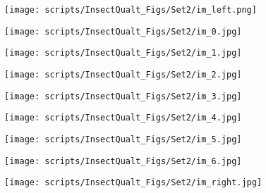 \documentclass[10pt,twocolumn,letterpaper]{article}
\begin{document}
\begin{table*}[!t]
\begin{figure*}[t]
\begin{center}
    \begin{subfigure}[b]{0.1\textwidth}
        \centering
        \texttt{[image: scripts/InsectQualt\_Figs/Set2/im\_left.png]}
    \end{subfigure}
    \hfill
    \begin{subfigure}[b]{0.1\textwidth}
        \centering
        \texttt{[image: scripts/InsectQualt\_Figs/Set2/im\_0.jpg]}
    \end{subfigure}
    \hfill
    \begin{subfigure}[b]{0.1\textwidth}
        \centering
        \texttt{[image: scripts/InsectQualt\_Figs/Set2/im\_1.jpg]}
    \end{subfigure}
    \hfill
    \begin{subfigure}[b]{0.1\textwidth}
        \centering
        \texttt{[image: scripts/InsectQualt\_Figs/Set2/im\_2.jpg]}
    \end{subfigure}
    \hfill
    \begin{subfigure}[b]{0.1\textwidth}
        \centering
        \texttt{[image: scripts/InsectQualt\_Figs/Set2/im\_3.jpg]}
    \end{subfigure}
    \hfill
    \begin{subfigure}[b]{0.1\textwidth}
        \centering
        \texttt{[image: scripts/InsectQualt\_Figs/Set2/im\_4.jpg]}
    \end{subfigure}
    \hfill
    \begin{subfigure}[b]{0.1\textwidth}
        \centering
        \texttt{[image: scripts/InsectQualt\_Figs/Set2/im\_5.jpg]}
    \end{subfigure}
    \hfill
    \begin{subfigure}[b]{0.1\textwidth}
        \centering
        \texttt{[image: scripts/InsectQualt\_Figs/Set2/im\_6.jpg]}
    \end{subfigure}
    \hfill
    \begin{subfigure}[b]{0.1\textwidth}
        \centering
        \texttt{[image: scripts/InsectQualt\_Figs/Set2/im\_right.jpg]}
    \end{subfigure}
    



\end{center}
\end{figure*}
\end{table*}
\end{document}
